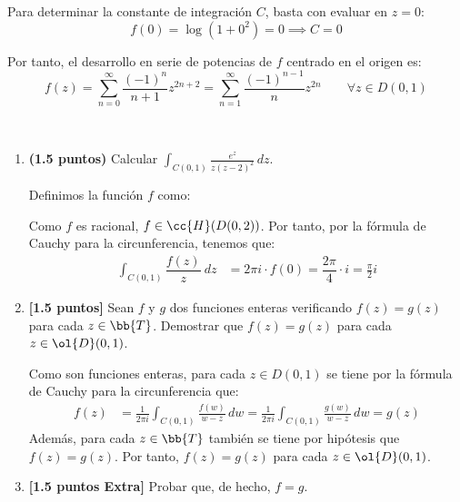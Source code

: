 \documentclass[12pt]{article}
\begin{document}
\begin{ejercicio}[3.5 puntos]
        Para determinar la constante de integración $C$, basta con evaluar en $z=0$:
        \begin{equation*}
            f(0) = \log(1+0^2) = 0
            \implies C = 0
        \end{equation*}

        Por tanto, el desarrollo en serie de potencias de $f$ centrado en el origen es:
        \begin{equation*}
            f(z) = \sum_{n=0}^{\infty} \frac{(-1)^n}{n+1} z^{2n+2}
            = \sum_{n=1}^{\infty} \frac{(-1)^{n-1}}{n} z^{2n} \qquad \forall z\in D(0,1)
        \end{equation*}
    \end{ejercicio}

    \begin{ejercicio}~
        \begin{enumerate}
            \item \textbf{(1.5 puntos)} Calcular $\displaystyle \int_{C(0,1)} \frac{e^z}{z(z - 2)^2} \, dz$.
            
            Definimos la función $f$ como:

            Como $f$ es racional, $f\in \cc{H}(D(0,2))$. Por tanto, por la fórmula de Cauchy para la circunferencia, tenemos que:
            \begin{align*}
                \int_{C(0,1)} \dfrac{f(z)}{z}\ dz &= 2\pi i \cdot f(0)=\dfrac{2\pi}{4}\cdot i = \frac{\pi}{2} i
            \end{align*}
            \item \textbf{[1.5 puntos]} Sean $f$ y $g$ dos funciones enteras verificando $f(z) = g(z)$ para cada $z \in \bb{T}$. Demostrar que $f(z) = g(z)$ para cada $z \in \ol{D}(0, 1)$.
            
            Como son funciones enteras, para cada $z\in D(0,1)$ se tiene por la fórmula de Cauchy para la circunferencia que:
            \begin{align*}
                f(z) &= \frac{1}{2\pi i} \int_{C(0,1)} \frac{f(w)}{w-z} \, dw
                = \frac{1}{2\pi i} \int_{C(0,1)} \frac{g(w)}{w-z} \, dw
                = g(z)
            \end{align*}
            Además, para cada $z\in \bb{T}$ también se tiene por hipótesis que $f(z)=g(z)$. Por tanto, $f(z)=g(z)$ para cada $z\in \ol{D}(0,1)$.
            \item \textbf{[1.5 puntos Extra]} Probar que, de hecho, $f = g$.
            

\end{enumerate}
\end{ejercicio}
\end{document}
